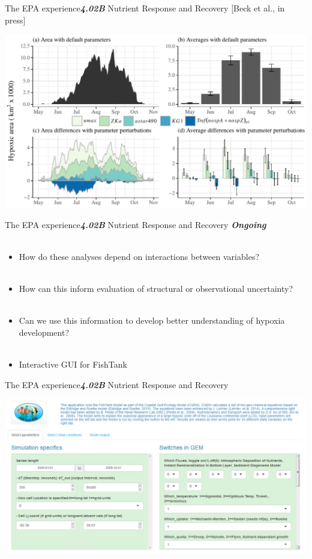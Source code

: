 \documentclass[serif]{beamer}\usepackage[]{graphicx}\usepackage[]{color}
\newcommand{\emtxt}[1]{\textbf{\textit{#1}}}
\begin{document}
\begin{frame}{The EPA experience}{\emtxt{4.02B} Nutrient Response and Recovery {\footnotesize [Beck et al., in press]}}
\centerline{\includegraphics[width=\textwidth]{fig/areachg1.pdf}}
\end{frame}

\begin{frame}{The EPA experience}{\emtxt{4.02B} Nutrient Response and Recovery}
\emtxt{Ongoing}\\~\\
\begin{itemize}
\item How do these analyses depend on interactions between variables? \\~\\
\item How can this inform evaluation of structural or observational uncertainty? \\~\\
\item Can we use this information to develop better understanding of hypoxia development? \\~\\
\item Interactive GUI for FishTank
\end{itemize}
\end{frame}

\begin{frame}{The EPA experience}{\emtxt{4.02B} Nutrient Response and Recovery}
\centerline{\includegraphics[width = 1.05\textwidth]{fig/fishtank_gui.png}}
\end{frame}
\end{document}
